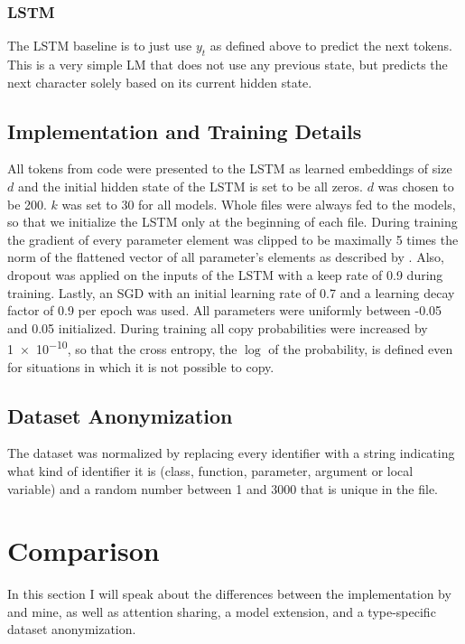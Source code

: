 \documentclass[11pt]{article}
\begin{document}
\subsubsection{LSTM}
The LSTM baseline is to just use $y_t$ as defined above to predict the next tokens. This is a very simple LM that does not use any previous state, but predicts the next character solely based on its current hidden state.

\subsection{Implementation and Training Details}
All tokens from code were presented to the LSTM as learned embeddings of size $d$ and the initial hidden state of the LSTM is set to be all zeros. $d$ was chosen to be 200. $k$ was set to 30 for all models. Whole files were always fed to the models, so that we initialize the LSTM only at the beginning of each file.
During training the gradient of every parameter element was clipped to be maximally 5 times the norm of the flattened vector of all parameter's elements as described by \cite{pascanu2012difficulty}.  Also, dropout was applied on the inputs of the LSTM with a keep rate of 0.9 during training. Lastly, an SGD with an initial learning rate of 0.7 and a learning decay factor of 0.9 per epoch was used. All parameters were uniformly between -0.05 and 0.05 initialized. During training all copy probabilities were increased by \num{1e-10}, so that the cross entropy, the $\log$ of the probability, is defined even for situations in which it is not possible to copy.

\subsection{Dataset Anonymization}
\label{normalization}
The dataset was normalized by replacing every identifier with a string indicating what kind of identifier it is (class, function, parameter, argument or local variable) and a random number between 1 and 3000 that is unique in the file.

\section{Comparison}
In this section I will speak about the differences between the implementation by \cite{bhoopchand2016learning} and mine, as well as attention sharing, a model extension, and a type-specific dataset anonymization.
\end{document}
